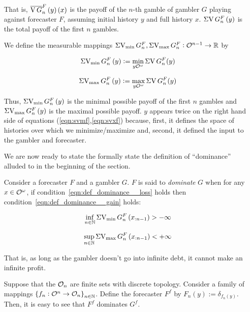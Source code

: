 That is, $\overline{\operatorname{V} G}^F_n\left(y\right)(x)$ is the payoff of the $n$-th gamble of gambler $G$ playing against forecaster $F$, assuming initial history $y$ and full history $x$. $\operatorname{\Sigma V} G^F_n\left(y\right)$ is the total payoff of the first $n$ gambles.

We define the measurable mappings $\operatorname{\Sigma V_{\min}} G^F_n, \operatorname{\Sigma V_{\max}} G^F_n: \mathcal{O}^{n-1} \rightarrow \mathbb{R}$ by

\begin{equation}
\label{eqn:svmf}
\operatorname{\Sigma V_{\min}} G^F_n\left(y\right):=\min_{y\mathcal{O}^\omega} \operatorname{\Sigma V} G^F_n(y)
\end{equation}

\begin{equation}
\label{eqn:svxf}
\operatorname{\Sigma V_{\max}} G^F_n\left(y\right):=\max_{y\mathcal{O}^\omega} \operatorname{\Sigma V} G^F_n(y)
\end{equation}

Thus, $\operatorname{\Sigma V_{\min}} G^F_n\left(y\right)$ is the minimal possible payoff of the first $n$ gambles and $\operatorname{\Sigma V_{\max}} G^F_n\left(y\right)$ is the maximal possible payoff. $y$ appears twice on the right hand side of equations (\ref{eqn:svmf},\ref{eqn:svxf}) because, first, it defines the space of histories over which we minimize/maximize and, second, it defined the input to the gambler and forecaster.

We are now ready to state the formally state the definition of \enquote{dominance} alluded to in the beginning of the section.

\begin{definition}
\label{def:dominance}

Consider a forecaster $F$ and a gambler $G$. $F$ is said to \emph{dominate} $G$ when for any $x \in \mathcal{O}^\omega$, if condition~\ref{eqn:def_dominance__loss} holds then condition~\ref{eqn:def_dominance__gain} holds:

\begin{equation}
\label{eqn:def_dominance__loss}
\inf_{n \in \mathbb{N}} {\operatorname{\Sigma V_{\min}} G^F_{n}\left(x_{:n-1}\right)} > -\infty
\end{equation}

\begin{equation}
\label{eqn:def_dominance__gain}
\sup_{n \in \mathbb{N}} {\operatorname{\Sigma V_{\max}} G^F_{n}\left(x_{:n-1}\right)} < +\infty
\end{equation}

\end{definition}

That is, as long as the gambler doesn't go into infinite debt, it cannot make an infinite profit.

\begin{samepage}
\begin{example}

Suppose that the $\mathcal{O}_n$ are finite sets with discrete topology. Consider a family of mappings $\left\{f_n: \mathcal{O}^n \rightarrow \mathcal{O}_n\right\}_{n\in\mathbb{N}}$. Define the forecaster $F^f$ by $F_n(y) := \delta_{f_n(y)}$. Then, it is easy to see that $F^f$ dominates $G^f$.

\end{example}
\end{samepage}

